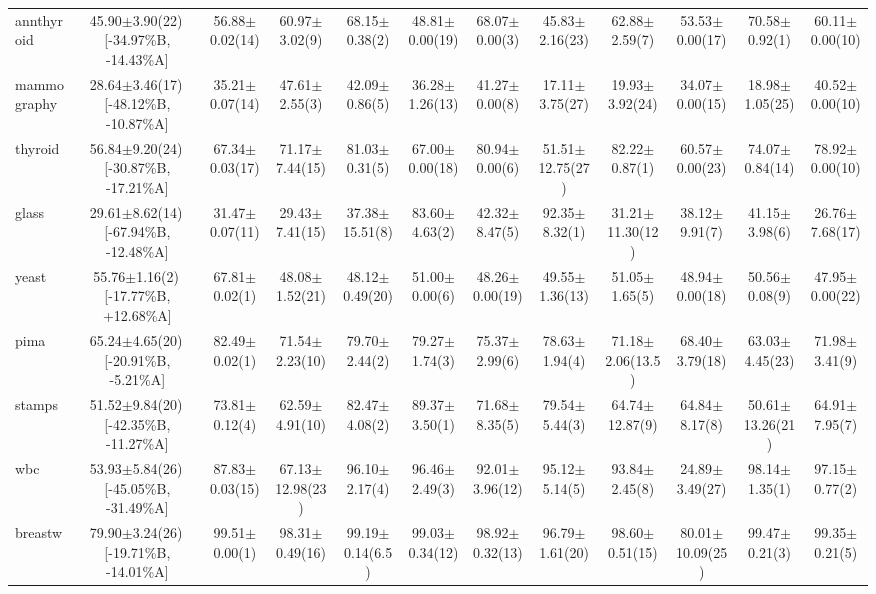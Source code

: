 \documentclass[conference]{IEEEtran}
\begin{document}
\begin{table}
{\begin{tabular}{lccccccccccc}
				annthyroid & 45.90$\pm$3.90(22)\,[{-}34.97\%B, {-}14.43\%A] & 56.88$\pm$0.02(14) & 60.97$\pm$3.02(9) & 68.15$\pm$0.38(2) & 48.81$\pm$0.00(19) & 68.07$\pm$0.00(3) & 45.83$\pm$2.16(23) & 62.88$\pm$2.59(7) & 53.53$\pm$0.00(17) & 70.58$\pm$0.92(1) & 60.11$\pm$0.00(10) \\
				mammography & 28.64$\pm$3.46(17)\,[{-}48.12\%B, {-}10.87\%A] & 35.21$\pm$0.07(14) & 47.61$\pm$2.55(3) & 42.09$\pm$0.86(5) & 36.28$\pm$1.26(13) & 41.27$\pm$0.00(8) & 17.11$\pm$3.75(27) & 19.93$\pm$3.92(24) & 34.07$\pm$0.00(15) & 18.98$\pm$1.05(25) & 40.52$\pm$0.00(10) \\
				thyroid & 56.84$\pm$9.20(24)\,[{-}30.87\%B, {-}17.21\%A] & 67.34$\pm$0.03(17) & 71.17$\pm$7.44(15) & 81.03$\pm$0.31(5) & 67.00$\pm$0.00(18) & 80.94$\pm$0.00(6) & 51.51$\pm$12.75(27) & 82.22$\pm$0.87(1) & 60.57$\pm$0.00(23) & 74.07$\pm$0.84(14) & 78.92$\pm$0.00(10) \\
				glass & 29.61$\pm$8.62(14)\,[{-}67.94\%B, {-}12.48\%A] & 31.47$\pm$0.07(11) & 29.43$\pm$7.41(15) & 37.38$\pm$15.51(8) & 83.60$\pm$4.63(2) & 42.32$\pm$8.47(5) & 92.35$\pm$8.32(1) & 31.21$\pm$11.30(12) & 38.12$\pm$9.91(7) & 41.15$\pm$3.98(6) & 26.76$\pm$7.68(17) \\
				yeast & 55.76$\pm$1.16(2)\,[{-}17.77\%B, {+}12.68\%A] & 67.81$\pm$0.02(1) & 48.08$\pm$1.52(21) & 48.12$\pm$0.49(20) & 51.00$\pm$0.00(6) & 48.26$\pm$0.00(19) & 49.55$\pm$1.36(13) & 51.05$\pm$1.65(5) & 48.94$\pm$0.00(18) & 50.56$\pm$0.08(9) & 47.95$\pm$0.00(22) \\
				pima & 65.24$\pm$4.65(20)\,[{-}20.91\%B, {-}5.21\%A] & 82.49$\pm$0.02(1) & 71.54$\pm$2.23(10) & 79.70$\pm$2.44(2) & 79.27$\pm$1.74(3) & 75.37$\pm$2.99(6) & 78.63$\pm$1.94(4) & 71.18$\pm$2.06(13.5) & 68.40$\pm$3.79(18) & 63.03$\pm$4.45(23) & 71.98$\pm$3.41(9) \\
				stamps & 51.52$\pm$9.84(20)\,[{-}42.35\%B, {-}11.27\%A] & 73.81$\pm$0.12(4) & 62.59$\pm$4.91(10) & 82.47$\pm$4.08(2) & 89.37$\pm$3.50(1) & 71.68$\pm$8.35(5) & 79.54$\pm$5.44(3) & 64.74$\pm$12.87(9) & 64.84$\pm$8.17(8) & 50.61$\pm$13.26(21) & 64.91$\pm$7.95(7) \\
				wbc & 53.93$\pm$5.84(26)\,[{-}45.05\%B, {-}31.49\%A] & 87.83$\pm$0.03(15) & 67.13$\pm$12.98(23) & 96.10$\pm$2.17(4) & 96.46$\pm$2.49(3) & 92.01$\pm$3.96(12) & 95.12$\pm$5.14(5) & 93.84$\pm$2.45(8) & 24.89$\pm$3.49(27) & 98.14$\pm$1.35(1) & 97.15$\pm$0.77(2) \\
				breastw & 79.90$\pm$3.24(26)\,[{-}19.71\%B, {-}14.01\%A] & 99.51$\pm$0.00(1) & 98.31$\pm$0.49(16) & 99.19$\pm$0.14(6.5) & 99.03$\pm$0.34(12) & 98.92$\pm$0.32(13) & 96.79$\pm$1.61(20) & 98.60$\pm$0.51(15) & 80.01$\pm$10.09(25) & 99.47$\pm$0.21(3) & 99.35$\pm$0.21(5) \\

\end{tabular}}
\end{table}
\end{document}
